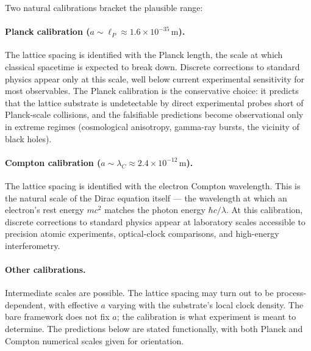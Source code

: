 Two natural calibrations bracket the plausible range:

\paragraph{Planck calibration ($a \sim \ell_P \approx 1.6 \times 10^{-35}\,\text{m}$).}
The lattice spacing is identified with the Planck length, the scale
at which classical spacetime is expected to break down. Discrete
corrections to standard physics appear only at this scale, well
below current experimental sensitivity for most observables. The
Planck calibration is the conservative choice: it predicts that the
lattice substrate is undetectable by direct experimental probes
short of Planck-scale collisions, and the falsifiable predictions
become observational only in extreme regimes (cosmological
anisotropy, gamma-ray bursts, the vicinity of black holes).

\paragraph{Compton calibration ($a \sim \lambda_C \approx 2.4 \times 10^{-12}\,\text{m}$).}
The lattice spacing is identified with the electron Compton
wavelength. This is the natural scale of the Dirac equation
itself --- the wavelength at which an electron's rest energy
$mc^2$ matches the photon energy $\hbar c/\lambda$. At this
calibration, discrete corrections to standard physics appear at
laboratory scales accessible to precision atomic experiments,
optical-clock comparisons, and high-energy interferometry.

\paragraph{Other calibrations.}
Intermediate scales are possible. The lattice spacing may turn out
to be process-dependent, with effective $a$ varying with the
substrate's local clock density. The bare framework does not fix
$a$; the calibration is what experiment is meant to determine. The
predictions below are stated functionally, with both Planck and
Compton numerical scales given for orientation.

